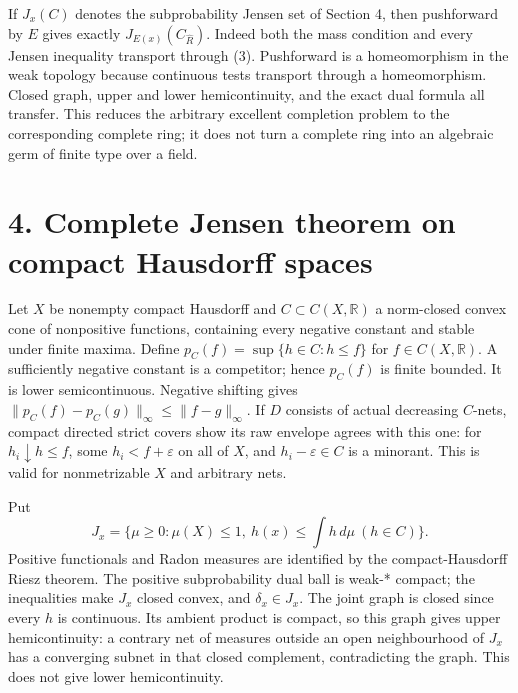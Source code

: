 \documentclass[11pt]{article}
\begin{document}
If $J_x(C)$ denotes the subprobability Jensen set of Section 4, then pushforward by $E$ gives exactly $J_{E(x)}(C_{\widehat R})$. Indeed both the mass condition and every Jensen inequality transport through (3). Pushforward is a homeomorphism in the weak topology because continuous tests transport through a homeomorphism. Closed graph, upper and lower hemicontinuity, and the exact dual formula all transfer. This reduces the arbitrary excellent completion problem to the corresponding complete ring; it does not turn a complete ring into an algebraic germ of finite type over a field.

\section{4. Complete Jensen theorem on compact Hausdorff spaces}

Let $X$ be nonempty compact Hausdorff and $C\subset C(X,\mathbb R)$ a norm-closed convex cone of nonpositive functions, containing every negative constant and stable under finite maxima. Define $p_C(f)=\sup\{h\in C:h\le f\}$ for $f\in C(X,\mathbb R)$. A sufficiently negative constant is a competitor; hence $p_C(f)$ is finite bounded. It is lower semicontinuous. Negative shifting gives $\|p_C(f)-p_C(g)\|_\infty\le\|f-g\|_\infty$. If $D$ consists of actual decreasing $C$-nets, compact directed strict covers show its raw envelope agrees with this one: for $h_i\downarrow h\le f$, some $h_i<f+\varepsilon$ on all of $X$, and $h_i-\varepsilon\in C$ is a minorant. This is valid for nonmetrizable $X$ and arbitrary nets.

Put
\[
 J_x=\{\mu\ge0:\mu(X)\le1,\ h(x)\le\int h\,d\mu\ (h\in C)\}.
\]
Positive functionals and Radon measures are identified by the compact-Hausdorff Riesz theorem. The positive subprobability dual ball is weak-* compact; the inequalities make $J_x$ closed convex, and $\delta_x\in J_x$. The joint graph is closed since every $h$ is continuous. Its ambient product is compact, so this graph gives upper hemicontinuity: a contrary net of measures outside an open neighbourhood of $J_x$ has a converging subnet in that closed complement, contradicting the graph. This does not give lower hemicontinuity.
\end{document}
